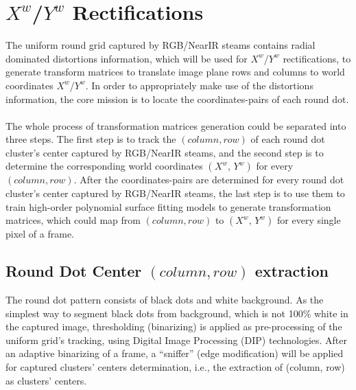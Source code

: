 \section{\(X^{w}\)/\(Y^{w}\) Rectifications}
\label{sectionXY_rectification}
The uniform round grid captured by RGB/NearIR steams contains radial dominated distortions information, which will be used for \(X^{w}\)/\(Y^{w}\) rectifications, to generate transform matrices to translate image plane rows and columns to world coordinates \(X^{w}\)/\(Y^{w}\). In order to appropriately make use of the distortions information, the core mission is to locate the coordinates-pairs of each round dot. \\\\
%
The whole process of transformation matrices generation could be separated into three steps. %
The first step is to track the \((column, row)\) of each round dot cluster's center captured by RGB/NearIR steams, and the second step is to determine the corresponding world coordinates \((X^w, \,Y^w)\) for every \((column, row)\). After the coordinates-pairs are determined for every round dot cluster's center captured by RGB/NearIR steams, the last step is to use them to train high-order polynomial surface fitting models to generate transformation matrices, which could map from \((column, row)\) to \((X^w, \,Y^w)\) for every single pixel of a frame.
%
\subsection{Round Dot Center \((column, row)\) extraction}
\label{RowColumnExtraction}
The round dot pattern consists of black dots and white background. As the simplest way to segment black dots from background, which is not 100\% white in the captured image, thresholding (binarizing) is applied as pre-processing of the uniform grid's tracking, using Digital Image Processing (DIP) technologies. After an adaptive binarizing of a frame, a \enquote{sniffer} (edge modification) will be applied for captured clusters' centers determination, i.e., the extraction of (column, row) as clusters' centers.\par
%
